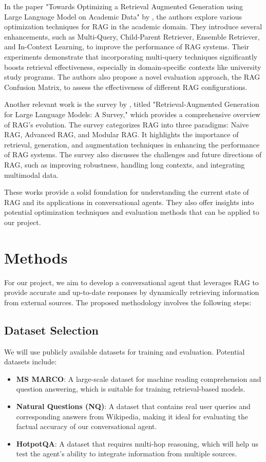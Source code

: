 \documentclass[fleqn,moreauthors,10pt]{ds_report}
\begin{document}
In the paper "Towards Optimizing a Retrieval Augmented Generation using Large Language Model on Academic Data" by \cite{afzal2024towards}, the authors explore various optimization techniques for RAG in the academic domain. They introduce several enhancements, such as Multi-Query, Child-Parent Retriever, Ensemble Retriever, and In-Context Learning, to improve the performance of RAG systems. Their experiments demonstrate that incorporating multi-query techniques significantly boosts retrieval effectiveness, especially in domain-specific contexts like university study programs. The authors also propose a novel evaluation approach, the RAG Confusion Matrix, to assess the effectiveness of different RAG configurations.

Another relevant work is the survey by \cite{gao2024retrievalaugmentedgenerationlargelanguage}, titled "Retrieval-Augmented Generation for Large Language Models: A Survey," which provides a comprehensive overview of RAG's evolution. The survey categorizes RAG into three paradigms: Naive RAG, Advanced RAG, and Modular RAG. It highlights the importance of retrieval, generation, and augmentation techniques in enhancing the performance of RAG systems. The survey also discusses the challenges and future directions of RAG, such as improving robustness, handling long contexts, and integrating multimodal data.

These works provide a solid foundation for understanding the current state of RAG and its applications in conversational agents. They also offer insights into potential optimization techniques and evaluation methods that can be applied to our project.


\section*{Methods}
For our project, we aim to develop a conversational agent that leverages RAG to provide accurate and up-to-date responses by dynamically retrieving information from external sources. The proposed methodology involves the following steps:

\subsection*{Dataset Selection}
We will use publicly available datasets for training and evaluation. Potential datasets include:
\begin{itemize}
    \item \textbf{MS MARCO}: A large-scale dataset for machine reading comprehension and question answering, which is suitable for training retrieval-based models.
    \item \textbf{Natural Questions (NQ)}: A dataset that contains real user queries and corresponding answers from Wikipedia, making it ideal for evaluating the factual accuracy of our conversational agent.
    \item \textbf{HotpotQA}: A dataset that requires multi-hop reasoning, which will help us test the agent's ability to integrate information from multiple sources.
\end{itemize}
\end{document}
